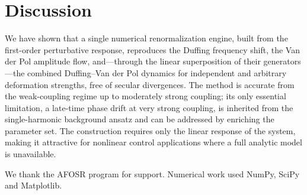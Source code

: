 \documentclass[aps,pre,twocolumn,showpacks,nofootinbib,superscriptaddress]{revtex4-2}
\begin{document}
\section{Discussion}
\label{sec:discussion}

We have shown that a single numerical renormalization engine, built from the
first-order perturbative response, reproduces the Duffing frequency shift, the
Van der Pol amplitude flow, and---through the linear superposition of their
generators---the combined Duffing--Van der Pol dynamics for independent and
arbitrary deformation strengths, free of secular divergences. The method is
accurate from the weak-coupling regime up to moderately strong coupling; its
only essential limitation, a late-time phase drift at very strong coupling, is
inherited from the single-harmonic background ansatz and can be addressed by
enriching the parameter set. The construction requires only the linear response
of the system, making it attractive for nonlinear control applications where a
full analytic model is unavailable.

\begin{acknowledgments}
We thank the AFOSR program for support. Numerical work used
NumPy, SciPy and Matplotlib.
\end{acknowledgments}



\end{document}
